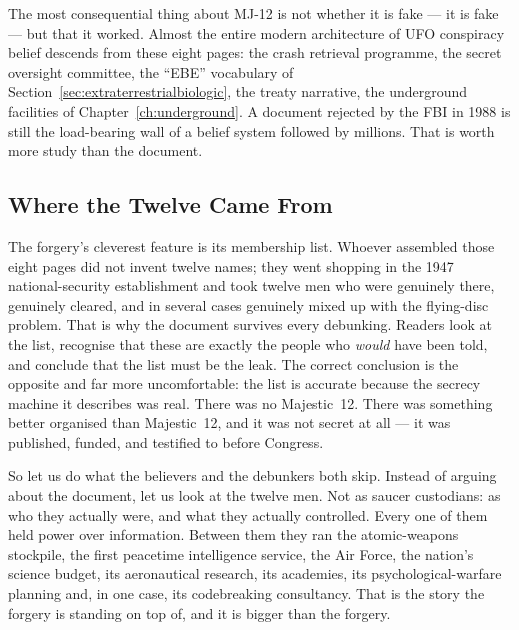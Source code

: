\begin{funfact}
The most consequential thing about MJ-12 is not whether it is fake --- it is fake --- but that
it worked. Almost the entire modern architecture of UFO conspiracy belief descends from these
eight pages: the crash retrieval programme, the secret oversight committee, the ``EBE''
vocabulary of Section~\ref{sec:extraterrestrialbiologic}, the treaty narrative, the underground facilities of
Chapter~\ref{ch:underground}. A document rejected by the FBI in 1988 is still the load-bearing
wall of a belief system followed by millions. That is worth more study than the document.
\end{funfact}

\subsection{Where the Twelve Came From}\label{sec:mj12origin}

The forgery's cleverest feature is its membership list. Whoever assembled those eight pages did
not invent twelve names; they went shopping in the 1947 national-security establishment and took
twelve men who were genuinely there, genuinely cleared, and in several cases genuinely mixed up
with the flying-disc problem. That is why the document survives every debunking. Readers look at
the list, recognise that these are exactly the people who \emph{would} have been told, and
conclude that the list must be the leak. The correct conclusion is the opposite and far more
uncomfortable: the list is accurate because the secrecy machine it describes was real. There was
no Majestic~12. There was something better organised than Majestic~12, and it was not secret at
all --- it was published, funded, and testified to before Congress.

So let us do what the believers and the debunkers both skip. Instead of arguing about the
document, let us look at the twelve men. Not as saucer custodians: as who they actually were, and
what they actually controlled. Every one of them held power over information. Between them they
ran the atomic-weapons stockpile, the first peacetime intelligence service, the Air Force, the
nation's science budget, its aeronautical research, its academies, its psychological-warfare
planning and, in one case, its codebreaking consultancy.  That is the story the forgery is standing on top of, and it is bigger than the
forgery.

